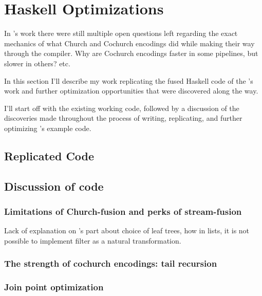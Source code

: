 
\section{Haskell Optimizations}\label{sec:haskell}
In \cite{Harper2011}'s work there were still multiple open questions left regarding the exact mechanics of what Church and Cochurch encodings did while making their way through the compiler. Why are Cochurch encodings faster in some pipelines, but slower in others? etc.

In this section I'll describe my work replicating the fused Haskell code of the \cite{Harper2011}'s work and further optimization opportunities that were discovered along the way.

I'll start off with the existing working code, followed by a discussion of the discoveries made throughout the process of writing, replicating, and further optimizing \cite{Harper2011}'s example code.

\subsection{Replicated Code}


\subsection{Discussion of code}
\subsubsection{Limitations of Church-fusion and perks of stream-fusion}\label{sec:tail}
Lack of explanation on \cite{Harper2011}'s part about choice of leaf trees, how in lists, it is not possible to implement filter as a natural transformation.
\subsubsection{The strength of cochurch encodings: tail recursion}
\subsubsection{Join point optimization}\label{sec:join}



\iffalse
One question that comes up is: Yes this fusion is nice, but how does the fused code actually provide a speedup, isn't the language already lazy and therefore not ripe for such a speedup? What are Haskell's other optimizations that come into play that pushes the shortcut fusion over the finish as a fast optimization?
\fi




